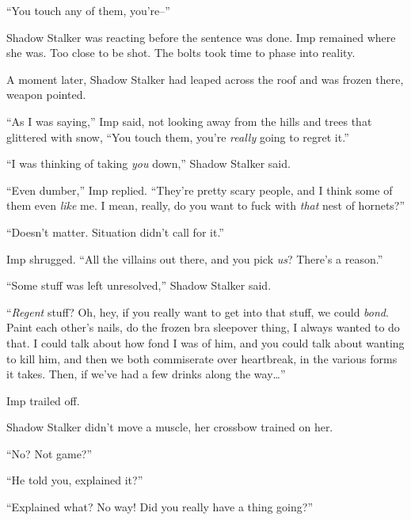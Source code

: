 ``You touch any of them, you're--''



Shadow Stalker was reacting before the sentence was done.  Imp remained where she was.  Too close to be shot.  The bolts took time to phase into reality.



A moment later, Shadow Stalker had leaped across the roof and was frozen there, weapon pointed.



``As I was saying,'' Imp said, not looking away from the hills and trees that glittered with snow, ``You touch them, you're \emph{really} going to regret it.''



``I was thinking of taking \emph{you} down,'' Shadow Stalker said.



``Even dumber,'' Imp replied.  ``They're pretty scary people, and I think some of them even \emph{like} me.  I mean, really, do you want to fuck with \emph{that} nest of hornets?''



``Doesn't matter.  Situation didn't call for it.''



Imp shrugged.  ``All the villains out there, and you pick \emph{us}?  There's a reason.''



``Some stuff was left unresolved,'' Shadow Stalker said.



``\emph{Regent} stuff?  Oh, hey, if you really want to get into that stuff, we could \emph{bond}.  Paint each other's nails, do the frozen bra sleepover thing, I always wanted to do that.  I could talk about how fond I was of him, and you could talk about wanting to kill him, and then we both commiserate over heartbreak, in the various forms it takes.  Then, if we've had a few drinks along the way\ldots''



Imp trailed off.



Shadow Stalker didn't move a muscle, her crossbow trained on her.



``No?  Not game?''



``He told you, explained it?''



``Explained what?  No way!  Did you really have a thing going?''



